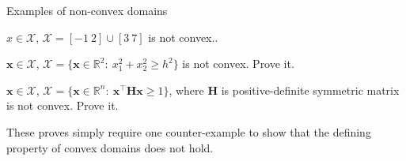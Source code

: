 \documentclass{beamer}
\begin{document}
\begin{frame}{Examples of non-convex domains}
	\begin{flushleft}
		
		
		$x \in \mathcal{X}$, $\mathcal{X} = [-1 \ 2] \cup [3 \ 7]$ is not convex..
		
		\bigskip
		
		$\mathbf{x} \in \mathcal{X}$, $\mathcal{X} = \{ \mathbf{x} \in \mathbb{R}^2: \ x_1^2+x_2^2 \geq h^2 \}$ is not convex. Prove it.
		
		\bigskip
		
		$\mathbf{x} \in \mathcal{X}$, $\mathcal{X} = \{ \mathbf{x} \in \mathbb{R}^n: \ \mathbf{x}^\top \mathbf{H} \mathbf{x} \geq 1 \}$, where $\mathbf{H}$ is positive-definite symmetric matrix is not convex. Prove it.
		
		\bigskip
		
		These proves simply require one counter-example to show that the defining property of convex domains does not hold.
		
	\end{flushleft}
\end{frame}
\end{document}
